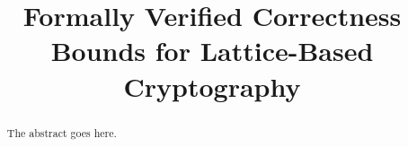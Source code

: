 \documentclass[conference,compsoc]{IEEEtran}
\begin{document}
\title{Formally Verified Correctness Bounds for Lattice-Based Cryptography}

\author{
  }


% 

\maketitle

\begin{abstract}
The abstract goes here.
\end{abstract}

\IEEEpeerreviewmaketitle












\end{document}
